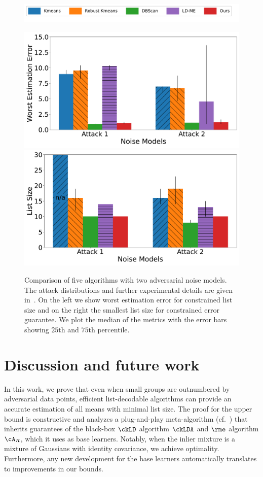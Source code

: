 \begin{figure}[t]
    \centering
    \begin{minipage}[t]{0.8\linewidth}
        \includegraphics[width=0.99\linewidth]{chapters/robust/figures/new_legend.pdf}
        \end{minipage}
    \begin{minipage}[t]{\linewidth}
        \includegraphics[width=0.49\linewidth]{chapters/robust/figures/gauss_inliers_2_attacks_error.pdf}
        \includegraphics[width=0.49\linewidth]{chapters/robust/figures/gauss_inliers_2_attacks_size.pdf}
    \end{minipage}
    \caption{
    Comparison of five algorithms with two adversarial noise models. The attack distributions and further experimental details are given in~. On the left we show worst estimation error for constrained list size and on the right the smallest list size for constrained error guarantee.
    We plot the median of the metrics with the error bars showing \(25\)th and \(75\)th percentile.
    }
    \label{fig:list_size}
\end{figure}
\vspace{-0.1in}
\section{Discussion and future work}
\label{sec:exp}


In this work, we prove that even when small groups are outnumbered by adversarial data points, efficient list-decodable algorithms can provide an accurate estimation of all means with minimal list size. 
The proof for the upper bound is constructive and analyzes a plug-and-play meta-algorithm  (cf.~) that inherits guarantees of the black-box $\ckLD$ algorithm $\ckLDA$ and $\rme$ algorithm $\cA_R$, which it uses as base learners. 
Notably, when the inlier mixture is a mixture of Gaussians with identity covariance, we achieve optimality.
Furthermore, any new development for the base learners
automatically translates to improvements in our bounds.

